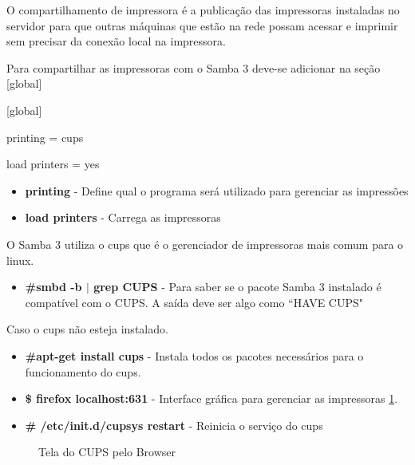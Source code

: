 O compartilhamento de impressora é a publicação das impressoras instaladas no servidor para que outras máquinas que estão na rede possam acessar e imprimir sem precisar da conexão local na impressora.

Para compartilhar as impressoras com o Samba 3 deve-se adicionar na seção [global] 

[global]

printing = cups

load printers = yes

\begin{itemize}
	\item \textbf{printing} - Define qual o programa será utilizado para gerenciar as impressões 
	\item \textbf{load printers} - Carrega as impressoras
\end{itemize}

O Samba 3 utiliza o cups que é o gerenciador de impressoras mais comum para o linux.

\begin{itemize}
	\item \textbf{\#smbd -b $|$ grep CUPS} - Para saber se o pacote Samba 3 instalado é compatível com o CUPS. A saída deve ser algo como ``HAVE CUPS"
\end{itemize}

Caso o cups não esteja instalado.

\begin{itemize}
	\item \textbf{\#apt-get install cups} - Instala todos os pacotes necessários para o funcionamento do cups.
	\item \textbf{\$ firefox localhost:631} - Interface gráfica para gerenciar as impressoras \ref{cups}.
	\item \textbf{\# /etc/init.d/cupsys restart} - Reinicia o serviço do cups
\end{itemize}

\begin{figure}[ht]
   	\centering
   	\caption{Tela do CUPS pelo Browser}
    \label{cups}
\end{figure}


